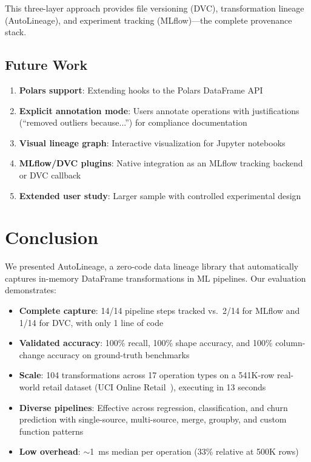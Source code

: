 \documentclass[10pt,twocolumn]{article}
\begin{document}
This three-layer approach provides file versioning (DVC), transformation lineage (AutoLineage), and experiment tracking (MLflow)---the complete provenance stack.

\subsection{Future Work}

\begin{enumerate}[leftmargin=*, nosep]
  \item \textbf{Polars support}: Extending hooks to the Polars DataFrame API
  \item \textbf{Explicit annotation mode}: Users annotate operations with justifications (``removed outliers because...'') for compliance documentation
  \item \textbf{Visual lineage graph}: Interactive visualization for Jupyter notebooks
  \item \textbf{MLflow/DVC plugins}: Native integration as an MLflow tracking backend or DVC callback
  \item \textbf{Extended user study}: Larger sample with controlled experimental design
\end{enumerate}

\section{Conclusion}
\label{sec:conclusion}

We presented AutoLineage, a zero-code data lineage library that automatically captures in-memory DataFrame transformations in ML pipelines. Our evaluation demonstrates:

\begin{itemize}[leftmargin=*, nosep]
  \item \textbf{Complete capture}: 14/14 pipeline steps tracked vs.\ 2/14 for MLflow and 1/14 for DVC, with only 1 line of code
  \item \textbf{Validated accuracy}: 100\% recall, 100\% shape accuracy, and 100\% column-change accuracy on ground-truth benchmarks
  \item \textbf{Scale}: 104 transformations across 17 operation types on a 541K-row real-world retail dataset (UCI Online Retail~\cite{chen2015}), executing in 13 seconds
  \item \textbf{Diverse pipelines}: Effective across regression, classification, and churn prediction with single-source, multi-source, merge, groupby, and custom function patterns
  \item \textbf{Low overhead}: $\sim$1~ms median per operation (33\% relative at 500K rows)
\end{itemize}
\end{document}
